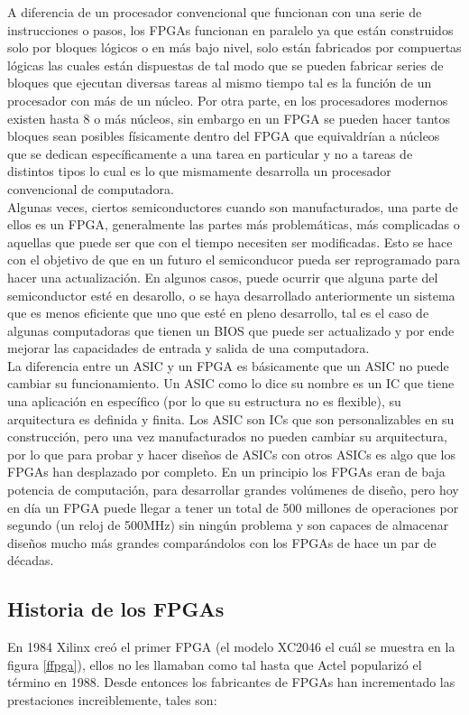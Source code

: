 \documentclass[twoside,spanish,ESP,MSc]{plantillaLabUPV}
\theoremstyle{definition}
\newcommand{\f}{FPGA }
\newcommand{\fs}{FPGAs }
\begin{document}
A diferencia de un procesador convencional que funcionan con una serie de instrucciones o pasos, los \fs funcionan en paralelo ya que están construidos solo por bloques lógicos o en más bajo nivel, solo están fabricados por compuertas lógicas las cuales están dispuestas de tal modo que se pueden fabricar series de bloques que ejecutan diversas tareas al mismo tiempo tal es la función de un procesador con más de un núcleo. Por otra parte, en los procesadores modernos existen hasta 8 o más núcleos, sin embargo en un \f se pueden hacer tantos bloques sean posibles físicamente dentro del \f que equivaldrían a núcleos que se dedican específicamente a una tarea en particular y no a tareas de distintos tipos lo cual es lo que mismamente desarrolla un procesador convencional de computadora. \\

Algunas veces, ciertos semiconductores cuando son manufacturados, una parte de ellos es un FPGA, generalmente las partes más problemáticas, más complicadas o aquellas que puede ser que con el tiempo necesiten ser modificadas. Esto se hace con el objetivo de que en un futuro el semiconducor pueda ser reprogramado para hacer una actualización. En algunos casos, puede ocurrir que alguna parte del semiconductor esté en desarollo, o se haya desarrollado anteriormente un sistema que es menos eficiente que uno que esté en pleno desarrollo, tal es el caso de algunas computadoras que tienen un BIOS que puede ser actualizado y por ende mejorar las capacidades de entrada y salida de una computadora.\\


La diferencia entre un ASIC y un \f es básicamente que un ASIC no puede cambiar su funcionamiento. Un ASIC como lo dice su nombre es un IC que tiene una aplicación en específico (por lo que su estructura no es flexible), su arquitectura es definida y finita. Los ASIC son ICs que son personalizables en su construcción, pero una vez manufacturados no pueden cambiar su arquitectura, por lo que para probar y hacer diseños de ASICs con otros ASICs es algo que los \fs han desplazado por completo. En un principio los \fs eran de baja potencia de computación, para desarrollar grandes volúmenes de diseño, pero hoy en día un \f puede llegar a tener un total de 500 millones de operaciones por segundo (un reloj de 500MHz) sin ningún problema y son capaces de almacenar diseños mucho más grandes comparándolos con los \fs de hace un par de décadas.

\subsection{Historia de los FPGAs}
En 1984 Xilinx creó el primer FPGA (el modelo XC2046  el cuál se muestra en la figura \ref{ffpga}), ellos no les llamaban como tal hasta que Actel popularizó el término en 1988. Desde entonces los fabricantes de \fs han incrementado las prestaciones increiblemente, tales son:
\end{document}
